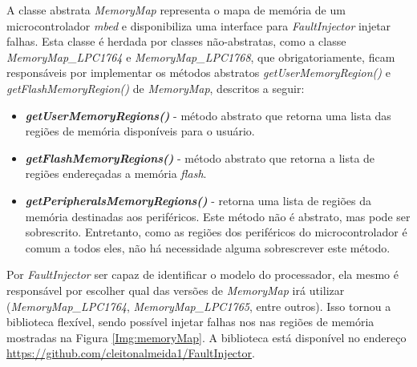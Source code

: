 A classe abstrata \textit{MemoryMap} representa o mapa de memória de um microcontrolador \textit{mbed} e disponibiliza uma interface para \textit{FaultInjector} injetar falhas. Esta classe é herdada por classes não-abstratas, como a classe \textit{MemoryMap\_LPC1764} e \textit{MemoryMap\_LPC1768}, que obrigatoriamente, ficam responsáveis por implementar os métodos abstratos \textit{getUserMemoryRegion()} e \textit{getFlashMemoryRegion()} de \textit{MemoryMap}, descritos a seguir:

\begin{itemize}
	\item \textbf{\textit{getUserMemoryRegions()}} - método abstrato que retorna uma lista das regiões de memória disponíveis para o usuário.				
	
	\item \textbf{\textit{getFlashMemoryRegions()}} - método abstrato que retorna a lista de regiões endereçadas a memória \textit{flash}.
	
	\item \textbf{\textit{getPeripheralsMemoryRegions()}} - retorna uma lista de regiões da memória destinadas aos periféricos. Este método não é abstrato, mas pode ser sobrescrito. Entretanto, como as regiões dos periféricos do microcontrolador é comum a todos eles, não há necessidade alguma sobrescrever este método.
\end{itemize}

Por \textit{FaultInjector} ser capaz de identificar o modelo do processador, ela mesmo é responsável por escolher qual das versões de \textit{MemoryMap} irá utilizar (\textit{MemoryMap\_LPC1764}, \textit{MemoryMap\_LPC1765}, entre outros). Isso tornou a biblioteca flexível, sendo possível injetar falhas nos nas regiões de memória mostradas na Figura \ref{Img:memoryMap}. A biblioteca está disponível no endereço \url{https://github.com/cleitonalmeida1/FaultInjector}.

